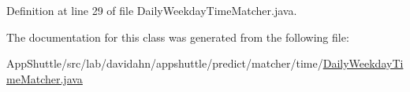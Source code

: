 \-Definition at line 29 of file \-Daily\-Weekday\-Time\-Matcher.\-java.



\-The documentation for this class was generated from the following file\-:\begin{DoxyCompactItemize}
\item 
\-App\-Shuttle/src/lab/davidahn/appshuttle/predict/matcher/time/\hyperlink{_daily_weekday_time_matcher_8java}{\-Daily\-Weekday\-Time\-Matcher.\-java}\end{DoxyCompactItemize}
